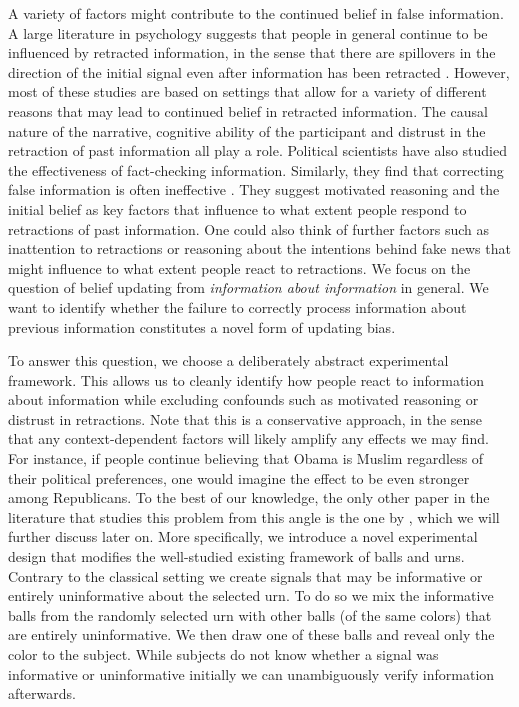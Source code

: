 \documentclass{article}
\begin{document}
A variety of factors might contribute to the continued belief in false information. A large literature in psychology suggests that people in general continue to be influenced by retracted information, in the sense that there are spillovers in the direction of the initial signal even after information has been retracted \citep[][and references therein]{Ecker2022}. However, most of these studies are based on settings that allow for a variety of different reasons that may lead to continued belief in retracted information. The causal nature of the narrative, cognitive ability of the participant and distrust in the retraction of past information all play a role. Political scientists have also studied the effectiveness of fact-checking information. Similarly, they find that correcting false information is often ineffective \citep{Nieminen2018}. They suggest motivated reasoning and the initial belief as key factors that influence to what extent people respond to retractions of past information. One could also think of further factors such as inattention to retractions or reasoning about the intentions behind fake news that might influence to what extent people react to retractions. We focus on the question of belief updating from \textit{information about information} in general. We want to identify whether the failure to correctly process information about previous information constitutes a novel form of updating bias. 

To answer this question, we choose a deliberately abstract experimental framework. This allows us to cleanly identify how people react to information about information while excluding confounds such as motivated reasoning or distrust in retractions. Note that this is a conservative approach, in the sense that any context-dependent factors will likely amplify any effects we may find. For instance, if people continue believing that Obama is Muslim regardless of their political preferences, one would imagine the effect to be even stronger among Republicans. To the best of our knowledge, the only other paper in the literature that studies this problem from this angle is the one by \cite{Goncalves2022}, which we will further discuss later on. 
More specifically, we introduce a novel experimental design that modifies the well-studied existing framework of balls and urns. Contrary to the classical setting we create signals that may be informative or entirely uninformative about the selected urn. To do so we mix the informative balls from the randomly selected urn with other balls (of the same colors) that are entirely uninformative. We then draw one of these balls and reveal only the color to the subject. While subjects do not know whether a signal was informative or uninformative initially we can unambiguously verify information afterwards. 
\end{document}
